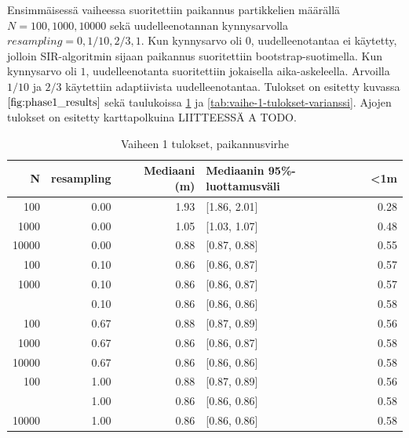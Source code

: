 \documentclass[
  12pt,
  a4paper, twoside]{book}
\begin{document}
Ensimmäisessä vaiheessa suoritettiin paikannus partikkelien määrällä \(N={100,1000,10000}\) sekä uudelleenotannan kynnysarvolla \(resampling={0,1/10,2/3,1}\). Kun kynnysarvo oli \(0\), uudelleenotantaa ei käytetty, jolloin SIR-algoritmin sijaan paikannus suoritettiin bootstrap-suotimella. Kun kynnysarvo oli \(1\), uudelleenotanta suoritettiin jokaisella aika-askeleella. Arvoilla \(1/10\) ja \(2/3\) käytettiin adaptiivista uudelleenotantaa. Tulokset on esitetty kuvassa \(\ref{fig:phase1_results}\) sekä taulukoissa \ref{tab:vaihe-1-tulokset} ja \ref{tab:vaihe-1-tulokset-varianssi}. Ajojen tulokset on esitetty karttapolkuina LIITTEESSÄ A TODO.

\begin{table}

\caption{\label{tab:vaihe-1-tulokset}Vaiheen 1 tulokset, paikannusvirhe}
\centering
\begin{tabular}[t]{rrrlr}
\toprule
N & resampling & Mediaani (m) & Mediaanin 95\%-luottamusväli & <1m\\
\midrule
100 & 0.00 & 1.93 & {}[1.86, 2.01] & 0.28\\
1000 & 0.00 & 1.05 & {}[1.03, 1.07] & 0.48\\
10000 & 0.00 & 0.88 & {}[0.87, 0.88] & 0.55\\
100 & 0.10 & 0.86 & {}[0.86, 0.87] & 0.57\\
1000 & 0.10 & 0.86 & {}[0.86, 0.87] & 0.57\\
\addlinespace
10000 & 0.10 & 0.86 & {}[0.86, 0.86] & 0.58\\
100 & 0.67 & 0.88 & {}[0.87, 0.89] & 0.56\\
1000 & 0.67 & 0.86 & {}[0.86, 0.87] & 0.58\\
10000 & 0.67 & 0.86 & {}[0.86, 0.86] & 0.58\\
100 & 1.00 & 0.88 & {}[0.87, 0.89] & 0.56\\
\addlinespace
1000 & 1.00 & 0.86 & {}[0.86, 0.86] & 0.58\\
10000 & 1.00 & 0.86 & {}[0.86, 0.86] & 0.58\\
\bottomrule
\end{tabular}
\end{table}
\end{document}
